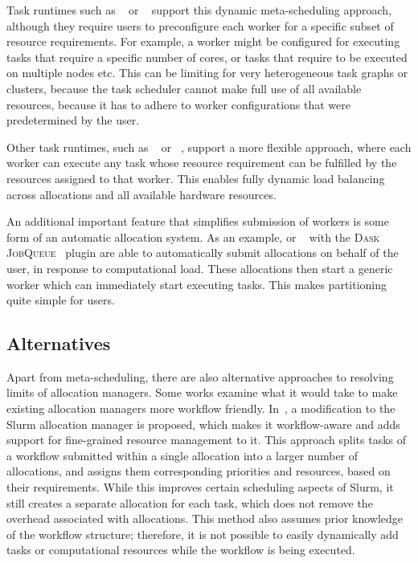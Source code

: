 Task runtimes such as \merlin{}~\cite{merlin} or
\parsl{}~\cite{parsl} support this dynamic meta-scheduling approach,
although they require users to preconfigure each worker for a specific subset of resource
requirements. For example, a worker might be configured for executing tasks that require a specific
number of cores, or tasks that require to be executed on multiple nodes etc. This can be limiting
for very heterogeneous task graphs or clusters, because the task scheduler cannot make full use of
all available resources, because it has to adhere to worker configurations that were predetermined
by the user.

Other task runtimes, such as \balsam{}~\cite{balsam} or
\fireworks~\cite{fireworks}, support a more flexible approach, where each worker can execute
any task whose resource requirement can be fulfilled by the resources assigned to that worker. This
enables fully dynamic load balancing across allocations and all available hardware resources.

An additional important feature that simplifies submission of workers is some form of an automatic
allocation system. As an example, \balsam{} or
\dask{}~\cite{dask} with the
\textsc{Dask JobQueue}~\cite{dask-jobqueue} plugin are able to automatically submit allocations
on behalf of the user, in response to computational load. These allocations then start a generic
worker which can immediately start executing tasks. This makes partitioning quite simple for users.

\subsection*{Alternatives}
Apart from meta-scheduling, there are also alternative approaches to resolving limits of allocation
managers. Some works examine what it would take to make existing allocation managers more workflow
friendly. In~\cite{slurm-workflow}, a modification to the Slurm allocation manager is proposed,
which makes it workflow-aware and adds support for fine-grained resource management to it. This
approach splits tasks of a workflow submitted within a single allocation into a larger number of
allocations, and assigns them corresponding priorities and resources, based on their requirements.
While this improves certain scheduling aspects of Slurm, it still creates a separate allocation for
each task, which does not remove the overhead associated with allocations. This method also assumes
prior knowledge of the workflow structure; therefore, it is not possible to easily dynamically add
tasks or computational resources while the workflow is being executed.


